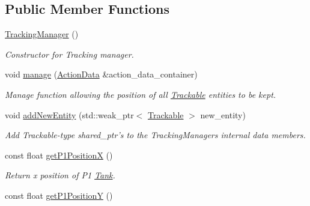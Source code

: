 \subsection*{Public Member Functions}
\begin{DoxyCompactItemize}
\item 
\hypertarget{class_tracking_manager_a9fb18e3ad20bc3eb3e9e3eb2e6b5748c}{\hyperlink{class_tracking_manager_a9fb18e3ad20bc3eb3e9e3eb2e6b5748c}{Tracking\+Manager} ()}\label{class_tracking_manager_a9fb18e3ad20bc3eb3e9e3eb2e6b5748c}

\begin{DoxyCompactList}\small\item\em Constructor for Tracking manager. \end{DoxyCompactList}\item 
\hypertarget{class_tracking_manager_a6331ac24f748ea336db5a7303a3dce60}{void \hyperlink{class_tracking_manager_a6331ac24f748ea336db5a7303a3dce60}{manage} (\hyperlink{class_action_data}{Action\+Data} \&action\+\_\+data\+\_\+container)}\label{class_tracking_manager_a6331ac24f748ea336db5a7303a3dce60}

\begin{DoxyCompactList}\small\item\em Manage function allowing the position of all \hyperlink{class_trackable}{Trackable} entities to be kept. \end{DoxyCompactList}\item 
\hypertarget{class_tracking_manager_af0102b33b841a415bdce8605b7c0a11b}{void \hyperlink{class_tracking_manager_af0102b33b841a415bdce8605b7c0a11b}{add\+New\+Entity} (std\+::weak\+\_\+ptr$<$ \hyperlink{class_trackable}{Trackable} $>$ new\+\_\+entity)}\label{class_tracking_manager_af0102b33b841a415bdce8605b7c0a11b}

\begin{DoxyCompactList}\small\item\em Add Trackable-\/type shared\+\_\+ptr's to the Tracking\+Managers internal data members. \end{DoxyCompactList}\item 
\hypertarget{class_tracking_manager_ab455df1659739739b2be5f42f08e4b26}{const float \hyperlink{class_tracking_manager_ab455df1659739739b2be5f42f08e4b26}{get\+P1\+Position\+X} ()}\label{class_tracking_manager_ab455df1659739739b2be5f42f08e4b26}

\begin{DoxyCompactList}\small\item\em Return x position of P1 \hyperlink{class_tank}{Tank}. \end{DoxyCompactList}\item 
\hypertarget{class_tracking_manager_ab79ae59918b07ad546cd7d95cfc983f6}{const float \hyperlink{class_tracking_manager_ab79ae59918b07ad546cd7d95cfc983f6}{get\+P1\+Position\+Y} ()}\label{class_tracking_manager_ab79ae59918b07ad546cd7d95cfc983f6}


\end{DoxyCompactItemize}
